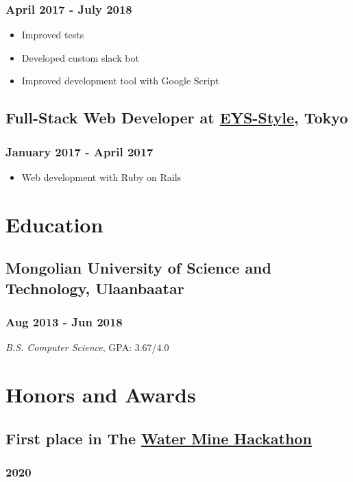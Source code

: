 \documentclass[a4]{article}
\begin{document}
\subsubsection{April 2017 - July 2018}
\label{sec:org3782211}
\begin{itemize}
\item Improved tests
\item Developed custom slack bot
\item Improved development tool with Google Script
\end{itemize}
\subsection{Full-Stack Web Developer at \href{http:www.eys-style.com}{EYS-Style}, Tokyo}
\label{sec:org71b0d21}
\subsubsection{January 2017 - April 2017}
\label{sec:orgca0741b}
\begin{itemize}
\item Web development with Ruby on Rails
\end{itemize}
\section{Education}
\label{sec:org9f2fb70}
\subsection{Mongolian University of Science and Technology, Ulaanbaatar}
\label{sec:org5cbc747}
\subsubsection{Aug 2013 - Jun 2018}
\label{sec:org41c7db0}
\emph{B.S. Computer Science}, GPA: 3.67/4.0
\section{Honors and Awards}
\label{sec:orgb55a465}
\subsection{First place in The \href{https://www.unread.today/c/2191}{Water Mine Hackathon}}
\label{sec:org36eb95f}
\subsubsection{2020}
\label{sec:org44f7dd5}
\end{document}
